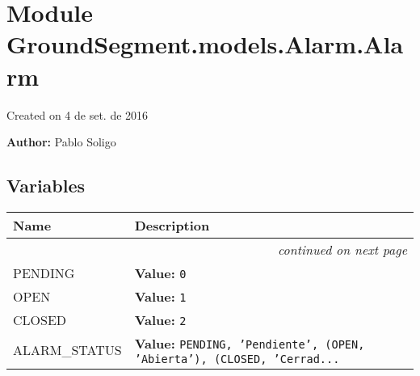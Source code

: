 %
%
%


\section{Module GroundSegment.models.Alarm.Alarm}

    \label{GroundSegment:models:Alarm:Alarm}
Created on 4 de set. de 2016

\textbf{Author:} Pablo Soligo





  \subsection{Variables}

    \vspace{-1cm}
\hspace{\varindent}\begin{longtable}{|p{\varnamewidth}|p{\vardescrwidth}|l}
\cline{1-2}
\cline{1-2} \centering \textbf{Name} & \centering \textbf{Description}& \\
\cline{1-2}
\endhead\cline{1-2}\multicolumn{3}{r}{\small\textit{continued on next page}}\\\endfoot\cline{1-2}
\endlastfoot\raggedright P\-E\-N\-D\-I\-N\-G\- & \raggedright \textbf{Value:} 
{\tt 0}&\\
\cline{1-2}
\raggedright O\-P\-E\-N\- & \raggedright \textbf{Value:} 
{\tt 1}&\\
\cline{1-2}
\raggedright C\-L\-O\-S\-E\-D\- & \raggedright \textbf{Value:} 
{\tt 2}&\\
\cline{1-2}
\raggedright A\-L\-A\-R\-M\-\_\-S\-T\-A\-T\-U\-S\- & \raggedright \textbf{Value:} 
{\tt PENDING, 'Pendiente', (OPEN, 'Abierta'), (CLOSED, 'Cerrad\texttt{...}}&\\
\cline{1-2}
\end{longtable}


